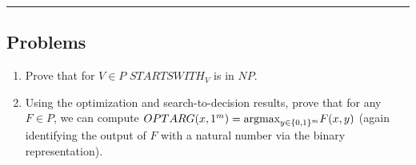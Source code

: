 \documentclass[10pt]{article}
\newcommand{\Line}{\vspace{.3cm}\hrule\vspace{.3cm}}
\begin{document}
\Line
\subsection{Problems}
\begin{enumerate}
    \item Prove that for $V\in P$ $STARTSWITH_V$ is in $NP$.
    \item Using the optimization and search-to-decision results, prove that for any $F\in P$, we can compute $OPTARG(x,1^m) = \text{argmax}_{y\in \{0,1\}^m} F(x,y)$ (again identifying the output of $F$ with a natural number via the binary representation).
\end{enumerate}
\end{document}
